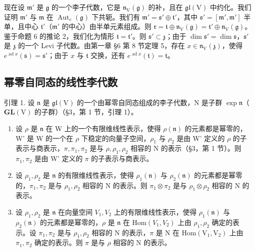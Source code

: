 现在设 \(\mathfrak{m}'\) 是 \(\mathfrak{g}\) 的一个李子代数，它是 \(\mathfrak{n}_{\mathrm{V}}(\mathfrak{g})\) 的补，且在 \(\mathfrak{gl}(\mathrm{V})\) 中约化。我们证明 \(\mathfrak{m}'\) 与 \(\mathfrak{m}\) 在 \(\operatorname{Aut}_e(\mathfrak{g})\) 下共轭。我们有 \(\mathfrak{m}' = \mathfrak{s}' \oplus \mathfrak{t}'\)，其中 \(\mathfrak{s}' = [\mathfrak{m}', \mathfrak{m}']\) 半单，且中心 \(\mathfrak{t}'\)（\(\mathfrak{m}'\) 的中心）由半单元素组成。则 \(\mathfrak{r} = \mathfrak{t} \oplus \mathfrak{n}_{\mathrm{V}}(\mathfrak{g}) = \mathfrak{t}' \oplus \mathfrak{n}_{\mathrm{V}}(\mathfrak{g})\)。鉴于命题 6 的推论 2，我们化为情形 \(\mathfrak{t} = \mathfrak{t}'\)。则 \(\mathfrak{s}' \subset \mathfrak{z}\)；由于 \(\dim \mathfrak{s}' = \dim \mathfrak{s}\)，\(\mathfrak{s}'\) 是 \(\mathfrak{z}\) 的一个 Levi 子代数。由第一章 §6 第 8 节定理 5，存在 \(x \in \mathfrak{n}_{\mathrm{V}}(\mathfrak{z})\)，使得 \(e^{\operatorname{ad} x}(\mathfrak{s}) = \mathfrak{s}'\)；由于 \(x\) 与 \(\mathfrak{t}\) 交换，还有 \(e^{\operatorname{ad} x}(\mathfrak{t}) = \mathfrak{t}\)。

\subsection{幂零自同态的线性李代数}

引理 1. 设 \(\mathfrak{n}\) 是 \(\mathfrak{gl}(\mathrm{V})\) 的一个由幂零自同态组成的李子代数，\(\mathrm{N}\) 是子群 \(\exp \mathfrak{n}\)（\(\mathbf{GL}(\mathrm{V})\) 的子群）（§3，第 1 节，引理 1）。

\begin{enumerate}
\def\labelenumi{(\roman{enumi})}
\item
  设 \(\rho\) 是 \(\mathfrak{n}\) 在 W 上的一个有限维线性表示，使得 \(\rho(\mathfrak{n})\) 的元素都是幂零的，W' 是 W 的一个在 \(\rho\) 下稳定的向量子空间，\(\rho_1\) 与 \(\rho_2\) 是由 W' 定义的 \(\rho\) 的子表示与商表示，\(\pi, \pi_1, \pi_2\) 是与 \(\rho, \rho_1, \rho_2\) 相容的 N 的表示（§3，第 1 节）。则 \(\pi_1, \pi_2\) 是由 W' 定义的 \(\pi\) 的子表示与商表示。
\item
  设 \(\rho_1, \rho_2\) 是 \(\mathfrak{n}\) 的有限维线性表示，使得 \(\rho_1(\mathfrak{n})\) 与 \(\rho_2(\mathfrak{n})\) 的元素都是幂零的，\(\pi_1, \pi_2\) 是与 \(\rho_1, \rho_2\) 相容的 N 的表示。则 \(\pi_1 \otimes \pi_2\) 是与 \(\rho_1 \otimes \rho_2\) 相容的 N 的表示。
\item
  设 \(\rho_{1},\rho_{2}\) 是 \(\mathfrak{n}\) 在向量空间 \(V_{1},V_{2}\) 上的有限维线性表示，使得 \(\rho_1(\mathfrak{n})\) 与 \(\rho_{2}(\mathfrak{n})\) 的元素都是幂零的，\(\rho\) 是 \(\mathfrak{n}\) 在 \(\mathrm{Hom}(V_1,V_2)\) 上由 \(\rho_{1},\rho_{2}\) 确定的表示。设 \(\pi_1,\pi_2\) 是与 \(\rho_{1},\rho_{2}\) 相容的 N 的表示，\(\pi\) 是 N 在 \(\mathrm{Hom}(\mathrm{V}_1,\mathrm{V}_2)\) 上由 \(\pi_1,\pi_2\) 确定的表示。则 \(\pi\) 是与 \(\rho\) 相容的 N 的表示。
\end{enumerate}

